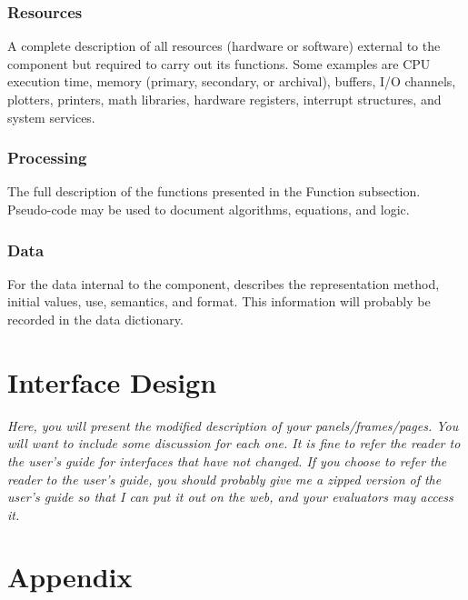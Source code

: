 \documentclass[11pt,a4paper]{article}
\begin{document}
\subsubsection{Resources}
A complete description of all resources (hardware or software) external to the component but required to carry out its functions. Some examples are CPU execution time, memory (primary, secondary, or archival), buffers, I/O channels, plotters, printers, math libraries, hardware registers, interrupt structures, and system services.

\subsubsection{Processing}
The full description of the functions presented in the Function subsection. Pseudo-code may be used to document algorithms, equations, and logic.

\subsubsection{Data}
For the data internal to the component, describes the representation method, initial values, use, semantics, and format. This information will probably be recorded in the data dictionary.

\section{Interface Design}
\textit{Here, you will present the modified description of your panels/frames/pages. You will want to include some discussion for each one. It is fine to refer the reader to the user's guide for interfaces that have not changed. If you choose to refer the reader to the user's guide, you should probably give me a zipped version of the user's guide so that I can put it out on the web, and your evaluators may access it.}

\appendix
\section{Appendix}
\end{document}
